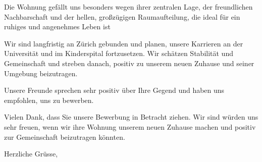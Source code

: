 \documentclass[11pt, a4paper]{letter}
\begin{document}
\begin{letter}{}
Die Wohnung gefällt uns besonders wegen ihrer zentralen Lage, der freundlichen Nachbarschaft und der hellen, großzügigen Raumaufteilung, die ideal für ein ruhiges und angenehmes Leben ist

Wir sind langfristig an Zürich gebunden und planen, unsere Karrieren an der Universität und im Kinderspital fortzusetzen.
Wir schätzen Stabilität und Gemeinschaft und streben danach, positiv zu unserem neuen Zuhause und seiner Umgebung beizutragen.

Unsere Freunde sprechen sehr positiv über Ihre Gegend und haben uns empfohlen, uns zu bewerben.

Vielen Dank, dass Sie unsere Bewerbung in Betracht ziehen. Wir sind würden uns sehr freuen, wenn wir ihre Wohnung unserem neuen Zuhause machen und positiv zur Gemeinschaft beizutragen könnten.

\closing{Herzliche Grüsse,} 
\ifodd\value{page}
    \newpage
    \thispagestyle{empty}  %
    \mbox{}                %
    \newpage
\fi
\end{letter}
\end{document}
